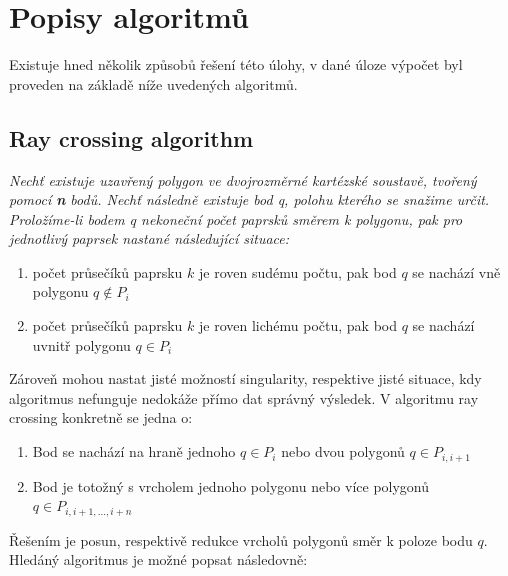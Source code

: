 \documentclass{article}
\begin{document}
\section{Popisy algoritmů} %
Existuje hned několik způsobů řešení této úlohy, v dané úloze výpočet byl proveden na základě níže uvedených algoritmů.
\subsection{Ray crossing algorithm}
\textsl{Nechť existuje uzavřený polygon ve dvojrozměrné kartézské soustavě, tvořený pomocí \textbf n bodů. Nechť následně existuje bod q, polohu kterého se snažime určit. Proložíme-li bodem q nekoneční počet paprsků směrem k polygonu, pak pro jednotlivý paprsek nastané následující situace: }
\begin{enumerate}
\item   počet průsečíků paprsku  $k$ je roven sudému počtu, pak  bod $q$ se nachází vně polygonu  $q {\not \in} P_i$ 
\item  počet průsečíků paprsku  $k$ je roven lichému počtu, pak  bod $q$ se nachází uvnitř polygonu  $q \in P_i$
\end{enumerate} 
Zároveň mohou nastat jisté možností singularity, respektive jisté situace, kdy algoritmus nefunguje nedokáže přímo dat správný výsledek. V algoritmu ray crossing konkretně se jedna o:
\begin{enumerate}
\item   Bod se nachází na hraně jednoho  $q {\in} P_i$ nebo dvou polygonů $q {\in} P_{i,i+1}$ 
\item   Bod je totožný s vrcholem jednoho polygonu nebo více polygonů $q {\in} P_{i,i+1,...,i+n}$
\end{enumerate} 
Řešením je posun, respektivě redukce vrcholů polygonů směr k poloze bodu  $q$.
\\
Hledáný algoritmus je možné popsat následovně:
\end{document}
